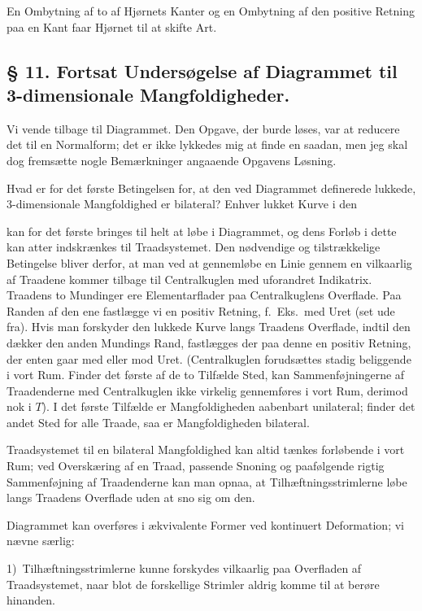 \documentclass{article}
\begin{document}
En Ombytning af to af Hjørnets Kanter og en Ombytning af den positive Retning paa en Kant faar Hjørnet til at skifte Art.

\subsection*{§ 11. Fortsat Undersøgelse af Diagrammet til 3-dimensionale Mangfoldigheder.}

Vi vende tilbage til Diagrammet. Den Opgave, der burde løses, var at reducere det til en Normalform; det er ikke lykkedes mig at finde en saadan, men jeg skal dog fremsætte nogle Bemærkninger angaaende Opgavens Løsning.

Hvad er for det første Betingelsen for, at den ved Diagrammet definerede lukkede, 3-dimensionale Mangfoldighed er bilateral? Enhver lukket Kurve i den

kan for det første bringes til helt at løbe i Diagrammet, og dens Forløb i dette kan atter indskrænkes til Traadsystemet. Den nødvendige og tilstrækkelige Betingelse bliver derfor, at man ved at gennemløbe en Linie gennem en vilkaarlig af Traadene kommer tilbage til Centralkuglen med uforandret Indikatrix. Traadens to Mundinger ere Elementarflader paa Centralkuglens Overflade. Paa Randen af den ene fastlægge vi en positiv Retning, f.~Eks.\ med Uret (set ude fra). Hvis man forskyder den lukkede Kurve langs Traadens Overflade, indtil den dækker den anden Mundings Rand, fastlægges der paa denne en positiv Retning, der enten gaar med eller mod Uret. (Centralkuglen forudsættes stadig beliggende i vort Rum. Finder det første af de to Tilfælde Sted, kan Sammenføjningerne af Traadenderne med Centralkuglen ikke virkelig gennemføres i vort Rum, derimod nok i $T$). I det første Tilfælde er Mangfoldigheden aabenbart unilateral; finder det andet Sted for alle Traade, saa er Mangfoldigheden bilateral.

Traadsystemet til en bilateral Mangfoldighed kan altid tænkes forløbende i vort Rum; ved Overskæring af en Traad, passende Snoning og paafølgende rigtig Sammenføjning af Traadenderne kan man opnaa, at Tilhæftningsstrimlerne løbe langs Traadens Overflade uden at sno sig om den.

Diagrammet kan overføres i ækvivalente Former ved kontinuert Deformation; vi nævne særlig:

1)~Tilhæftningsstrimlerne kunne forskydes vilkaarlig paa Overfladen af Traadsystemet, naar blot de forskellige Strimler aldrig komme til at berøre hinanden.
\end{document}
